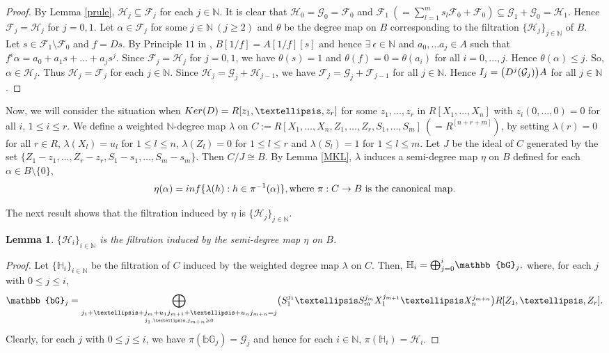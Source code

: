 \documentclass[a4paper,12pt]{article}
\newtheorem{lem}[thm]{Lemma}
\newcommand{\bN}{\mathbb N}
\newcommand{\lF}{\mathcal{F}}
\newcommand{\lG}{\mathcal{G}}
\newcommand{\bG}{\mathbb{bG}}
\newcommand{\lH}{\mathcal{H}}
\newcommand{\bH}{\mathbb{H}}
\begin{document}
{\begin{proof}
By Lemma \ref{prule}, $\lH_j\subseteq\lF_j$ for each $j\in\bN$. It is clear that $\lH_0=\lG_0=\lF_0$ and $\lF_1~(=\sum_{l=1}^ms_l\lF_0+\lF_0)\subseteq{\lG_1}+\lG_0=\lH_1$. Hence $\lF_j=\lH_j$ for $j=0,1$. Let $\alpha\in\lF_j$ for some $j\in\bN~(j\geqslant 2)$ and $\theta$ be the degree map on $B$ corresponding to the filtration $\{\lH_j\}_{j\in\bN}$ of $B$.
Let $s\in{\lF_1\setminus\lF_0}$ and $f=Ds$. By Principle $11$ in \cite{F}, $B[1/f]=A[1/f][s]$ and hence $\exists~\epsilon\in\bN$ and $a_0,\dots a_j\in A$ such that $f^\epsilon\alpha=a_0+a_1s+\dots+a_js^j$. Since $\lF_j=\lH_j$ for $j=0,1$, we have $\theta(s)=1$ and $\theta(f)=0=\theta(a_i)$ for all $i=0,\dots,j$. Hence $\theta(\alpha)\leqslant j$. So, $\alpha\in\lH_j$. Thus $\lH_j=\lF_j$ for each $j\in\bN$. Since $\lH_j=\lG_j+\lH_{j-1}$, we have $\lF_j=\lG_j+\lF_{j-1}$ for all $j\in\bN$. Hence $I_j=\big{(}D^j(\lG_{j})\big{)}A$ for all $j\in\bN$.
\end{proof}

\indent Now, we will consider the situation when ${\rm Ker}(D)=R[z_1,\dots,z_r]$ for some $z_1,\dots,z_r$ in $R[X_1,\dots,X_n]$ with $z_i(0,\dots,0)=0$ for all $i$, $1\leqslant i\leqslant r$. We define a weighted $\bN$-degree map $\lambda$ on $C:=R[X_1,\dots,X_n,Z_1,\dots,Z_r,S_1,\dots,S_m]~(=R^{[n+r+m]})$, by setting $\lambda(r)=0$ for all $r\in R$, $\lambda(X_l)=u_l$ for  $1\leqslant l\leqslant n$, $\lambda(Z_l)=0$ for $1\leqslant l\leqslant r$ and $\lambda(S_l)=1$ for $1\leqslant l\leqslant m$. Let $J$ be the ideal of $C$ generated by the set $\{Z_1-z_1,\dots,Z_r-z_r,S_1-s_1,\dots,S_m-s_m\}$. Then $C/J\cong B$. By Lemma \ref{MKL}, $\lambda$ induces a semi-degree map $\eta$ on $B$ defined for each $\alpha\in B\setminus\{0\}$, $$\eta(\alpha)={\rm inf}\{\lambda(h):h\in{\pi}^{-1}(\alpha)\}, \text{where }\pi:C \rightarrow B \text{ is the canonical map}.$$

\smallskip\noindent
The next result shows that the filtration induced by $\eta$ is $\{\mathcal{H}_j\}_{j\in\bN}$.

\begin{lem}\label{induced fil of eta}
$\{\lH_i\}_{i\in\bN}$ is the filtration induced by the semi-degree map $\eta$ on $B$.
\end{lem}
\begin{proof}
Let $\{\bH_i\}_{i\in\bN}$ be the filtration of $C$ induced by the weighted degree map $\lambda$ on $C$. Then, $\bH_i=\text{\Large$\bigoplus$}_{j=0}^i{\bG}_j,$ where, for each $j$ with $0\leqslant j\leqslant i$, $${\bG}_j=\underset{\underset{j_1,\dots,j_{m+n}\geqslant 0}{j_1+\dots+j_m+u_1j_{m+1}+\dots+u_nj_{m+n}=j}}{\text{\Large$\bigoplus$}}\big{(}S_1^{j_1}\dots S_m^{j_m}X_1^{j_{m+1}}\dots X_n^{j_{m+n}}\big{)}R[Z_1,\dots,Z_r].$$ Clearly, for each $j$ with $0\leqslant j\leqslant i$, we have $\pi(\bG_j)=\lG_j$ and hence for each $i\in\bN$, $\pi(\bH_i)=\lH_i$.


\end{proof}}
\end{document}
